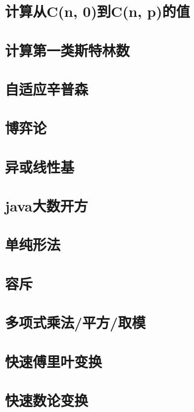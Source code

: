 \section{计算从C(n, 0)到C(n, p)的值}
\raggedbottom
\hrulefill
\section{计算第一类斯特林数}
\raggedbottom
\hrulefill
\section{自适应辛普森}
\raggedbottom
\hrulefill
\section{博弈论}
\raggedbottom
\hrulefill
\section{异或线性基}
\raggedbottom
\hrulefill
\section{java大数开方}
\raggedbottom
\hrulefill
\section{单纯形法}
\raggedbottom
\hrulefill
\section{容斥}
\raggedbottom
\hrulefill
\section{多项式乘法/平方/取模}
\raggedbottom
\hrulefill
\section{快速傅里叶变换}
\raggedbottom
\hrulefill
\section{快速数论变换}
\raggedbottom
\hrulefill
